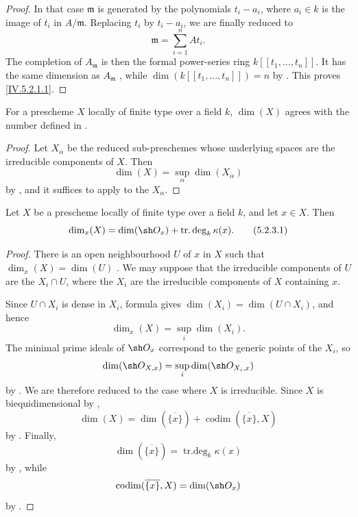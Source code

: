 \begin{proof}
In that case $\mathfrak m$ is generated by the polynomials
$t_i-a_i$, where $a_i\in k$ is the image of $t_i$ in
$A/\mathfrak m$.
Replacing $t_i$ by $t_i-a_i$, we are finally reduced to
\[
\mathfrak m=\sum_{i=1}^n At_i.
\]
The completion of $A_{\mathfrak m}$ is then the formal power-series
ring $k[[t_1,\ldots,t_n]]$.
It has the same dimension as $A_{\mathfrak m}$
, while
$\dim(k[[t_1,\ldots,t_n]])=n$ by .
This proves \eqref{IV.5.2.1.1}.
\end{proof}

\begin{corollary}[5.2.2]
\label{IV.5.2.2}
For a prescheme $X$ locally of finite type over a field $k$,
$\dim(X)$ agrees with the number defined in .
\end{corollary}

\begin{proof}
Let $X_\alpha$ be the reduced sub-preschemes whose underlying spaces
are the irreducible components of $X$.
Then
\[
\dim(X)=\sup_\alpha\dim(X_\alpha)
\]
by , and it suffices to apply
 to the $X_\alpha$.
\end{proof}

\begin{corollary}[5.2.3]
\label{IV.5.2.3}
Let $X$ be a prescheme locally of finite type over a field $k$, and
let $x\in X$. Then
\begin{equation}
\dim_x(X)=\dim(\sh O_x)+\operatorname{tr.deg}_k\kappa(x).
\tag{5.2.3.1}\label{IV.5.2.3.1}
\end{equation}
\end{corollary}

\begin{proof}
There is an open neighbourhood $U$ of $x$ in $X$ such that
$\dim_x(X)=\dim(U)$ .
We may suppose that the irreducible components of $U$ are the
$X_i\cap U$, where the $X_i$ are the irreducible components of $X$
containing $x$.


Since $U\cap X_i$ is dense in $X_i$, formula 
gives $\dim(X_i)=\dim(U\cap X_i)$, and hence
\[
\dim_x(X)=\sup_i\dim(X_i).
\]
The minimal prime ideals of $\sh O_x$ correspond to the generic
points of the $X_i$, so
\[
\dim(\sh O_{X,x})=\sup_i\dim(\sh O_{X_i,x})
\]
by .
We are therefore reduced to the case where $X$ is irreducible.
Since $X$ is biequidimensional by ,
\[
\dim(X)
  =\dim(\overline{\{x\}})
   +\operatorname{codim}(\overline{\{x\}},X)
\]
by .
Finally,
\[
\dim(\overline{\{x\}})
  =\operatorname{tr.deg}_k\kappa(x)
\]
by , while
\[
\operatorname{codim}(\overline{\{x\}},X)=\dim(\sh O_x)
\]
by .
\end{proof}

